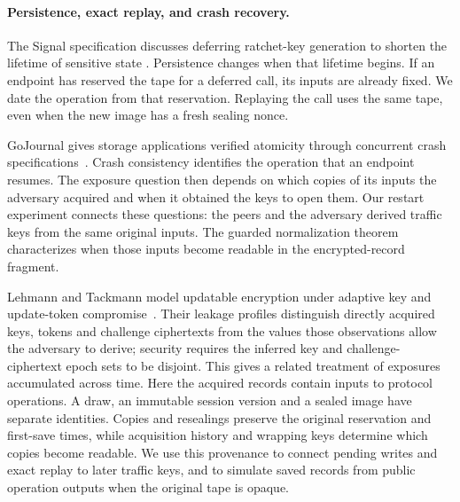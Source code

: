 \paragraph{Persistence, exact replay, and crash recovery.}
The Signal specification discusses deferring ratchet-key generation to shorten
the lifetime of sensitive state \cite[Section~8.5]{doubleratchet2025}.
Persistence changes when that lifetime begins. If an endpoint has
reserved the tape for a deferred call, its inputs are already fixed.
We date the operation from that reservation. Replaying the call uses
the same tape, even when the new image has a fresh sealing nonce.

GoJournal gives storage applications verified atomicity through
concurrent crash specifications~\cite{gojournal2021}. Crash consistency
identifies the operation that an endpoint resumes. The exposure question
then depends on which copies of its inputs the adversary acquired and
when it obtained the keys to open them. Our restart experiment connects
these questions: the peers and the adversary derived traffic keys from
the same original inputs. The guarded normalization theorem characterizes
when those inputs become readable in the encrypted-record fragment.

Lehmann and Tackmann model updatable encryption under adaptive key and
update-token compromise~\cite{lehmann2018updatable}. Their leakage profiles
distinguish directly acquired keys, tokens and challenge ciphertexts from
the values those observations allow the adversary to derive; security requires
the inferred key and challenge-ciphertext epoch sets to be disjoint. This gives
a related treatment of exposures accumulated across time. Here the acquired
records contain inputs to protocol operations. A draw, an immutable session
version and a sealed image have separate identities. Copies and resealings
preserve the original reservation and first-save times, while acquisition
history and wrapping keys determine which copies become readable.
We use this provenance to connect pending writes and exact replay to later
traffic keys, and to simulate saved records from public operation outputs
when the original tape is opaque.

